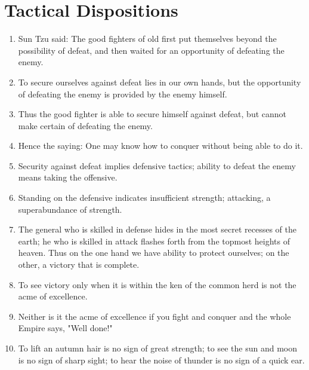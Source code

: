 \addtocounter{chapter}{1}\chapter*{Tactical Dispositions}
\begin{enumerate}
  
\item Sun Tzu said:  The good fighters of old first put
    themselves beyond the possibility of defeat, and then
    waited for an opportunity of defeating the enemy.

  \item To secure ourselves against defeat lies in our own hands, but
    the opportunity of defeating the enemy is provided by the enemy
    himself.
  \item Thus the good fighter is able to secure himself against
    defeat, but cannot make certain of defeating the enemy.

  \item Hence the saying: One may know how to conquer without being
    able to do it.

  \item Security against defeat implies defensive tactics; ability to
    defeat the enemy means taking the offensive.

  \item Standing on the defensive indicates insufficient strength;
    attacking, a superabundance of strength.

  \item The general who is skilled in defense hides in the most secret
    recesses of the earth; he who is skilled in attack flashes forth
    from the topmost heights of heaven. Thus on the one hand we have
    ability to protect ourselves; on the other, a victory that is
    complete.

  \item To see victory only when it is within the ken of the common
    herd is not the acme of excellence.

  \item Neither is it the acme of excellence if you fight and conquer
    and the whole Empire says, "Well done!"

  \item To lift an autumn hair is no sign of great strength; to see
    the sun and moon is no sign of sharp sight; to hear the noise of
    thunder is no sign of a quick ear.


\end{enumerate}
